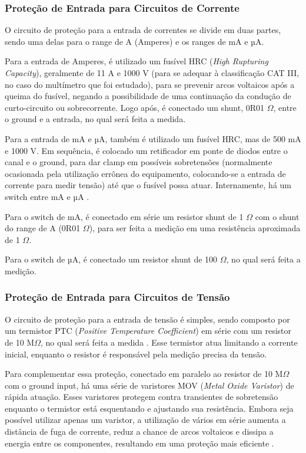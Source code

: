 \subsubsection{Proteção de Entrada para Circuitos de Corrente}\label{subsec:protecaoCorrente}

O circuito de proteção para a entrada de correntes se divide em duas partes, sendo uma delas para o range de A (Amperes) e os ranges de mA e µA.

Para a entrada de Amperes, é utilizado um fusível \gls{HRC} (\textit{High Rupturing Capacity}), geralmente de 11 A e 1000 V (para se adequar à classificação CAT III, no caso do multímetro que foi estudado), para se prevenir arcos voltaicos após a queima do fusível, negando a possibilidade de uma continuação da condução de curto-circuito ou sobrecorrente. Logo após, é conectado um shunt, 0R01 $\Omega$, entre o ground e a entrada, no qual será feita a medida.

Para a entrada de mA e µA, também é utilizado um fusível \gls{HRC}, mas de 500 mA e 1000 V. Em sequência, é colocado um retificador em ponte de diodos entre o canal e o ground, para dar clamp em possíveis sobretensões (normalmente ocasionada pela utilização errônea do equipamento, colocando-se a entrada de corrente para medir tensão) até que o fusível possa atuar. Internamente, há um switch entre mA e µA \cite{fluke27manual}.

Para o switch de mA, é conectado em série um resistor shunt de 1 $\Omega$ com o shunt do range de A (0R01 $\Omega$), para ser feita a medição em uma resistência aproximada de 1 $\Omega$.

Para o switch de µA, é conectado um resistor shunt de 100 $\Omega$, no qual será feita a medição. \cite{IPblog}%

\subsubsection{Proteção de Entrada para Circuitos de Tensão}\label{subsec:protecaoTensao}

O circuito de proteção para a entrada de tensão é simples, sendo composto por um termistor \gls{PTC} (\textit{Positive Temperature Coefficient}) em série com um resistor de 10 M$\Omega$, no qual será feita a medida \cite{fluke27manual}. Esse termistor atua limitando a corrente inicial, enquanto o resistor é responsável pela medição precisa da tensão.

Para complementar essa proteção, conectado em paralelo ao resistor de 10 M$\Omega$ com o ground input, há uma série de varistores \gls{MOV} (\textit{Metal Oxide Varistor}) de rápida atuação. Esses varistores protegem contra transientes de sobretensão enquanto o termistor está esquentando e ajustando sua resistência. Embora seja possível utilizar apenas um varistor, a utilização de vários em série aumenta a distância de fuga de corrente, reduz a chance de arcos voltaicos e dissipa a energia entre os componentes, resultando em uma proteção mais eficiente \cite{flukeblog}.

